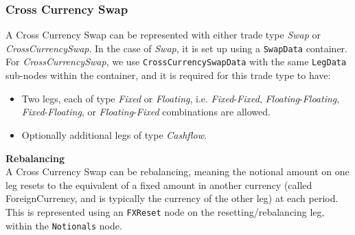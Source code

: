\subsubsection{Cross Currency Swap}
\label{ss:cross_currency_swap}

\ifdefined{}\fi

A Cross Currency Swap can be represented with either trade type \emph{Swap} or \emph{CrossCurrencySwap}. In the case of \emph{Swap}, it is set up using a {\tt SwapData} container. For \emph{CrossCurrencySwap}, we use {\tt CrossCurrencySwapData} with the same {\tt LegData} sub-nodes within the container, and it is required for this trade type to have: 
\begin{itemize}
 \item Two legs, each of type \emph{Fixed} or \emph{Floating}, i.e. \emph{Fixed}-\emph{Fixed}, \emph{Floating}-\emph{Floating}, \emph{Fixed}-\emph{Floating}, or \emph{Floating}-\emph{Fixed} combinations are allowed. 
\item  Optionally additional legs of type \emph{Cashflow}.
\end{itemize}

{\bf Rebalancing}\\
A Cross Currency Swap can be rebalancing, meaning the notional amount on one leg resets to the equivalent of a fixed amount in another currency (called ForeignCurrency, and is typically the currency of the other leg) at each period. This is represented using an \lstinline!FXReset! node on the resetting/rebalancing leg, within the \lstinline!Notionals! node. 


